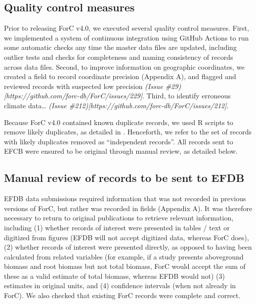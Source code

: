 \documentclass[, manuscript]{copernicus}
\begin{document}
\subsection{Quality control measures}

Prior to releasing ForC v4.0, we executed several quality control
measures. First, we implemented a system of continuous integration using
GitHub Actions \citep[\emph{sensu}][]{kim_using_inreview} to run some
automatic checks any time the master data files are updated, including
outlier tests and checks for completeness and naming consistency of
records across data files. Second, to improve information on geographic
coordinates, we created a field to record coordinate precision (Appendix
A), and flagged and reviewed records with suspected low precision
\emph{(Issue \#29){[}https://github.com/forc-db/ForC/issues/229{]}}.
Third, to identify erroneous climate data\ldots{} \emph{(Issue
\#212){[}https://github.com/forc-db/ForC/issues/212{]}}.

Because ForC v4.0 contained known duplicate records, we used R scripts
to remove likely duplicates, as detailed in
\citet{anderson-teixeira_carbon_2021}. Henceforth, we refer to the set
of records with likely duplicates removed as ``independent records''.
All records sent to EFCB were ensured to be original through manual
review, as detailed below.

\subsection{Manual review of records to be sent to EFDB}

EFDB data submissions required information that was not recorded in
previous versions of ForC, but rather was recorded in fields (Appendix
A). It was therefore necessary to return to original publications to
retrieve relevant information, including (1) whether records of interest
were presented in tables / text or digitized from figures (EFDB will not
accept digitized data, whereas ForC does), (2) whether records of
interest were presented directly, as opposed to having been calculated
from related variables (for example, if a study presents aboveground
biomass and root biomass but not total biomass, ForC would accept the
sum of these as a valid estimate of total biomass, whereas EFDB would
not) (3) estimates in original units, and (4) confidence intervals (when
not already in ForC). We also checked that existing ForC records were
complete and correct.
\end{document}
